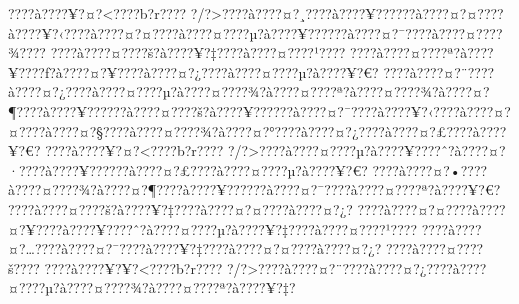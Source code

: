 \documentclass[11pt, openany]{book}
\begin{document}
{{{{{{{{{{{{{{{{{{{{{{{{{{{{{{{{{{{{{{{{{{{{{{{{{{{{{{{{{{{{{{{{{{{{{{{{{{{{{{{{{{{{{{{{{{{{{{{{{{{{{{{{{{{{{???\textbar{}?à???\textbar{}?¥?¤?\textless{}???\textbar{}?b?r???\textbar{}?
?/?\textgreater{}???\textbar{}?à???\textbar{}?¤?¸???\textbar{}?à???\textbar{}?¥?????\textbar{}?à???\textbar{}?¤?¤???\textbar{}?à???\textbar{}?¥?‹???\textbar{}?à???\textbar{}?¤?¤???\textbar{}?à???\textbar{}?¤???\textbar{}?µ?à???\textbar{}?¥?????\textbar{}?à???\textbar{}?¤?¯???\textbar{}?à???\textbar{}?¤???\textbar{}?¾???\textbar{}?
???\textbar{}?à???\textbar{}?¤???\textbar{}?š?à???\textbar{}?¥?‡???\textbar{}?à???\textbar{}?¤???\textbar{}?¹???\textbar{}?
???\textbar{}?à???\textbar{}?¤???\textbar{}?ª?à???\textbar{}?¥???\textbar{}?ƒ?à???\textbar{}?¤?¥???\textbar{}?à???\textbar{}?¤?¿???\textbar{}?à???\textbar{}?¤???\textbar{}?µ?à???\textbar{}?¥?€?
???\textbar{}?à???\textbar{}?¤?¨???\textbar{}?à???\textbar{}?¤?¿???\textbar{}?à???\textbar{}?¤???\textbar{}?µ?à???\textbar{}?¤???\textbar{}?¾?à???\textbar{}?¤???\textbar{}?ª?à???\textbar{}?¤???\textbar{}?¾?à???\textbar{}?¤?¶???\textbar{}?à???\textbar{}?¥?????\textbar{}?à???\textbar{}?¤???\textbar{}?š?à???\textbar{}?¥?????\textbar{}?à???\textbar{}?¤?¯???\textbar{}?à???\textbar{}?¥?‹???\textbar{}?à???\textbar{}?¤?¤???\textbar{}?à???\textbar{}?¤?§???\textbar{}?à???\textbar{}?¤???\textbar{}?¾?à???\textbar{}?¤?°???\textbar{}?à???\textbar{}?¤?¿???\textbar{}?à???\textbar{}?¤?£???\textbar{}?à???\textbar{}?¥?€?
???\textbar{}?à???\textbar{}?¥?¤?\textless{}???\textbar{}?b?r???\textbar{}?
?/?\textgreater{}???\textbar{}?à???\textbar{}?¤???\textbar{}?µ?à???\textbar{}?¥???\textbar{}?ˆ?à???\textbar{}?¤?·???\textbar{}?à???\textbar{}?¥?????\textbar{}?à???\textbar{}?¤?£???\textbar{}?à???\textbar{}?¤???\textbar{}?µ?à???\textbar{}?¥?€?
???\textbar{}?à???\textbar{}?¤?•???\textbar{}?à???\textbar{}?¤???\textbar{}?¾?à???\textbar{}?¤?¶???\textbar{}?à???\textbar{}?¥?????\textbar{}?à???\textbar{}?¤?¯???\textbar{}?à???\textbar{}?¤???\textbar{}?ª?à???\textbar{}?¥?€?
???\textbar{}?à???\textbar{}?¤???\textbar{}?š?à???\textbar{}?¥?‡???\textbar{}?à???\textbar{}?¤?¤???\textbar{}?à???\textbar{}?¤?¿?
???\textbar{}?à???\textbar{}?¤?¤???\textbar{}?à???\textbar{}?¤?¥???\textbar{}?à???\textbar{}?¥???\textbar{}?ˆ?à???\textbar{}?¤???\textbar{}?µ?à???\textbar{}?¥?‡???\textbar{}?à???\textbar{}?¤???\textbar{}?¹???\textbar{}?
???\textbar{}?à???\textbar{}?¤?\ldots{}???\textbar{}?à???\textbar{}?¤?¯???\textbar{}?à???\textbar{}?¥?‡???\textbar{}?à???\textbar{}?¤?¤???\textbar{}?à???\textbar{}?¤?¿?
???\textbar{}?à???\textbar{}?¤???\textbar{}?š???\textbar{}?
???\textbar{}?à???\textbar{}?¥?¥?\textless{}???\textbar{}?b?r???\textbar{}?
?/?\textgreater{}???\textbar{}?à???\textbar{}?¤?¨???\textbar{}?à???\textbar{}?¤?¿???\textbar{}?à???\textbar{}?¤???\textbar{}?µ?à???\textbar{}?¤???\textbar{}?¾?à???\textbar{}?¤???\textbar{}?ª?à???\textbar{}?¥?‡?
}}}}}}}}}}}}}}}}}}}}}}}}}}}}}}}}}}}}}}}}}}}}}}}}}}}}}}}}}}}}}}}}}}}}}}}}}}}}}}}}}}}}}}}}}}}}}}}}}}}}}}}}}}}}}
\end{document}

